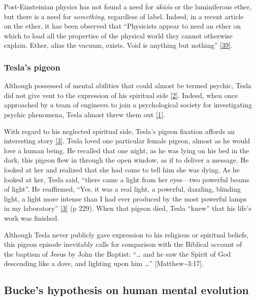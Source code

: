 \documentclass[
  12pt,
  british,
  a4paper,
  rgb,
  dvipsnames,
  svgnames,
  hyphens]{article}
\begin{document}
Post-Einsteinian physics has not found a need for \emph{ākāśa} or the
luminiferous ether, but there is a need for \emph{something}, regardless
of label. Indeed, in a recent article on the ether, it has been observed
that ``Physicists appear to need an ether on which to load all the
properties of the physical world they cannot otherwise explain. Ether,
alias the vacuum, exists. Void is anything but nothing''
\protect\hyperlink{ref-heil03}{{[}39{]}}.

\hypertarget{teslas-pigeon}{%
\subsubsection{Tesla's pigeon}\label{teslas-pigeon}}

Although possessed of mental abilities that could almost be termed
psychic, Tesla did not give vent to the expression of his spiritual side
\protect\hyperlink{ref-oneill80}{{[}2{]}}. Indeed, when once approached
by a team of engineers to join a psychological society for investigating
psychic phenomena, Tesla almost threw them out
\protect\hyperlink{ref-john83}{{[}1{]}}.

With regard to his neglected spiritual side, Tesla's pigeon fixation
affords an interesting story \protect\hyperlink{ref-cheney81}{{[}3{]}}.
Tesla loved one particular female pigeon, almost as he would love a
human being. He recalled that one night, as he was lying on his bed in
the dark, this pigeon flew in through the open window, as if to deliver
a message. He looked at her and realized that she had come to tell him
she was dying. As he looked at her, Tesla said, ``there came a light
from her eyes---two powerful beams of light''. He reaffirmed, ``Yes, it
was a real light, a powerful, dazzling, blinding light, a light more
intense than I had ever produced by the most powerful lamps in my
laboratory'' \protect\hyperlink{ref-cheney81}{{[}3{]}} (p 229). When
that pigeon died, Tesla ``knew'' that his life's work was finished.

Although Tesla never publicly gave expression to his religious or
spiritual beliefs, this pigeon episode inevitably calls for comparison
with the Biblical account of the baptism of Jesus by John the Baptist:
``\ldots{} and he saw the Spirit of God descending like a dove, and
lighting upon him \ldots{}'' {[}Matthew\textasciitilde3:17{]}.

\hypertarget{buckes-hypothesis-on-human-mental-evolution}{%
\subsection{Bucke's hypothesis on human mental
evolution}\label{buckes-hypothesis-on-human-mental-evolution}}
\end{document}
